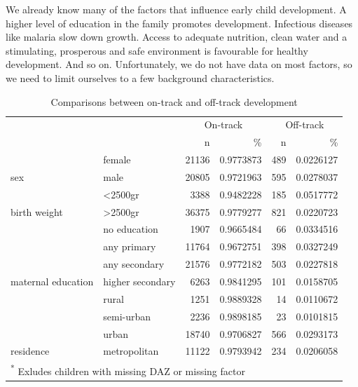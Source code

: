 \documentclass[
]{book}
\begin{document}
We already know many of the factors that influence early child development. A higher level of education in the family promotes development. Infectious diseases like malaria slow down growth. Access to adequate nutrition, clean water and a stimulating, prosperous and safe environment is favourable for healthy development. And so on. Unfortunately, we do not have data on most factors, so we need to limit ourselves to a few background characteristics.

\begin{table}

\caption{\label{tab:ontracktab}Comparisons between on-track and off-track development}
\centering
\begin{tabular}[t]{l|l|r|r|r|r}
\hline
\multicolumn{2}{c|}{ } & \multicolumn{2}{c|}{On-track} & \multicolumn{2}{c}{Off-track} \\
\cline{3-4} \cline{5-6}
 &  & n & \% & n & \%\\
\hline
 & female & 21136 & 0.9773873 & 489 & 0.0226127\\
\cline{2-6}
\multirow[t]{-2}{*}{\raggedright\arraybackslash sex} & male & 20805 & 0.9721963 & 595 & 0.0278037\\
\cline{1-6}
 & <2500gr & 3388 & 0.9482228 & 185 & 0.0517772\\
\cline{2-6}
\multirow[t]{-2}{*}{\raggedright\arraybackslash birth weight} & >2500gr & 36375 & 0.9779277 & 821 & 0.0220723\\
\cline{1-6}
 & no education & 1907 & 0.9665484 & 66 & 0.0334516\\
\cline{2-6}
 & any primary & 11764 & 0.9672751 & 398 & 0.0327249\\
\cline{2-6}
 & any secondary & 21576 & 0.9772182 & 503 & 0.0227818\\
\cline{2-6}
\multirow[t]{-4}{*}{\raggedright\arraybackslash maternal education} & higher secondary & 6263 & 0.9841295 & 101 & 0.0158705\\
\cline{1-6}
 & rural & 1251 & 0.9889328 & 14 & 0.0110672\\
\cline{2-6}
 & semi-urban & 2236 & 0.9898185 & 23 & 0.0101815\\
\cline{2-6}
 & urban & 18740 & 0.9706827 & 566 & 0.0293173\\
\cline{2-6}
\multirow[t]{-4}{*}{\raggedright\arraybackslash residence} & metropolitan & 11122 & 0.9793942 & 234 & 0.0206058\\
\hline
\multicolumn{6}{l}{\textsuperscript{*} Exludes children with missing DAZ or missing factor}\\
\end{tabular}
\end{table}
\end{document}
